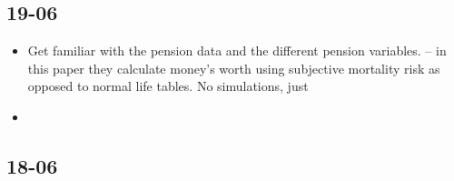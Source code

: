 \documentclass[12pt]{article}
\begin{document}
\subsection{\textbf{19-06}}
\begin{itemize}
      \item Get familiar with the pension data and the different pension variables. \cite{odea_sturrock_rest_2023} -- in this paper they calculate money's
            worth using subjective mortality risk as opposed to normal life tables. No simulations, just
      \item
\end{itemize}


\subsection{\textbf{18-06}}
\end{document}
